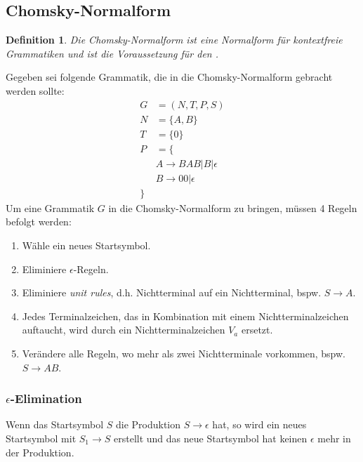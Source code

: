 \documentclass[12pt, oneside]{book}
\newtheorem{definition}{Definition}
\begin{document}
\subsection{Chomsky-Normalform}
\label{cnf}
\begin{definition}
    Die Chomsky-Normalform ist eine Normalform für kontextfreie Grammatiken und ist die Voraussetzung für den .
\end{definition}

Gegeben sei folgende Grammatik, die in die Chomsky-Normalform gebracht werden sollte:
\begin{align*}
    G&=(N,T,P,S)\\
    N&=\{A,B\}\\
    T&=\{0\}\\
    P&=\{\\
    &A\to BAB|B|\epsilon\\
    &B\to 00|\epsilon\\    
    \}
\end{align*}
Um eine Grammatik $G$ in die Chomsky-Normalform zu bringen, müssen 4 Regeln befolgt werden:
\begin{enumerate}
    \item Wähle ein neues Startsymbol.
    \item Eliminiere $\epsilon$-Regeln.
    \item Eliminiere \textit{unit rules}, d.h. Nichtterminal auf ein Nichtterminal, bspw. $S\to A$.
    \item Jedes Terminalzeichen, das in Kombination mit einem Nichtterminalzeichen auftaucht, wird durch ein Nichtterminalzeichen $V_a$ ersetzt.
    \item Verändere alle Regeln, wo mehr als zwei Nichtterminale vorkommen, bspw. $S\to AB$.
\end{enumerate}
\iffalse
\subsubsection[Epsilon-Elimination]{$\epsilon$-Elimination}
Wenn das Startsymbol $S$ die Produktion $S\to \epsilon$ hat, so wird ein neues Startsymbol mit $S_1 \to S$ erstellt und das neue Startsymbol hat keinen $\epsilon$ mehr in der Produktion.\par
\end{document}
